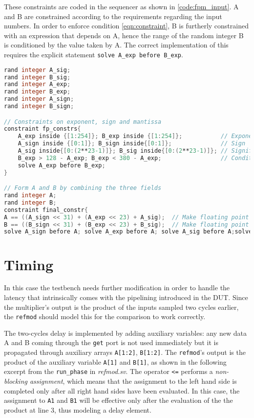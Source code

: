These constraints are coded in the sequencer as shown in \ref{code:fpm_input}. A and B are constrained according to the requirements regarding the input numbers. In order to enforce condition \ref{eqn:constraint}, B is furtherly constrained with an expression that depends on A, hence the range of the random integer B is conditioned by the value taken by A. The correct implementation of this requires the explicit statement \texttt{solve A\_exp before B\_exp}.

\begin{lstlisting}[language = verilog, label = code:fpm_input, caption=\textit{packet\_in.sv}]
rand integer A_sig;
rand integer B_sig;
rand integer A_exp;
rand integer B_exp;
rand integer A_sign;
rand integer B_sign;

// Constraints on exponent, sign and mantissa
constraint fp_constrs{
	A_exp inside {[1:254]}; B_exp inside {[1:254]};           // Exponent
	A_sign inside {[0:1]}; B_sign inside{[0:1]};              // Sign
	A_sig inside{[0:(2**23-1)]}; B_sig inside{[0:(2**23-1)]}; // Significand
	B_exp > 128 - A_exp; B_exp < 380 - A_exp;                 // Condition on sum of exponents
	solve A_exp before B_exp;
}

// Form A and B by combining the three fields
rand integer A;
rand integer B;
constraint final_constr{
A == ((A_sign << 31) + (A_exp << 23) + A_sig);  // Make floating point number A
B == ((B_sign << 31) + (B_exp << 23) + B_sig);  // Make floating point number B
solve A_sign before A; solve A_exp before A; solve A_sig before A;solve B_sign before B; solve B_exp before B;solve B_sig before B;}
\end{lstlisting}


\section{Timing}
In this case the testbench needs further modification in order to handle the latency that intrinsically comes with the pipelining introduced in the DUT. Since the multiplier's output is the product of the inputs sampled two cycles earlier, the \texttt{refmod} should model this for the comparison to work correctly.

The two-cycles delay is implemented by adding auxiliary variables: any new data A and B coming through the \texttt{get} port is not used immediately but it is propagated through auxiliary arrays \texttt{A[1:2]}, \texttt{B[1:2]}. The \texttt{refmod}'s output is the product of the auxiliary variable \texttt{A[1]} and \texttt{B[1]}, as shown in the following excerpt from the \texttt{run\_phase} in \textit{refmod.sv}. The operator \texttt{<=} performs a \textit{non-blocking assignment}, which means that the assignment to the left hand side is completed only after all right hand sides have been evaluated. In this case, the assignment to \texttt{A1} and \texttt{B1} will be effective only after the evaluation of the the product at line 3, thus modeling a delay element.

